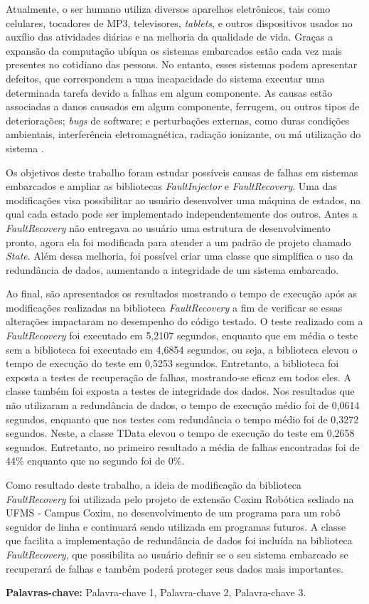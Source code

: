 {\setlength{\parindent}{0cm}
	
Atualmente, o ser humano utiliza diversos aparelhos eletrônicos, tais como celulares, tocadores de MP3, televisores, \textit{tablets}, e outros dispositivos usados no auxílio das atividades diárias e na melhoria da qualidade de vida. Graças a expansão da computação ubíqua os sistemas embarcados estão cada vez mais presentes no cotidiano das pessoas. No entanto, esses sistemas podem apresentar defeitos, que correspondem a uma incapacidade do sistema executar uma determinada tarefa devido a falhas em algum componente. As causas estão associadas a danos causados em algum componente, ferrugem, ou outros tipos de deteriorações; \textit{bugs} de software; e perturbações externas, como duras condições ambientais, interferência eletromagnética, radiação ionizante, ou má utilização do sistema \cite{Nelson:1990}.

Os objetivos deste trabalho foram estudar possíveis causas de falhas em sistemas embarcados e ampliar as bibliotecas \textit{FaultInjector} e \textit{FaultRecovery}. Uma das modificações visa possibilitar ao usuário desenvolver uma máquina de estados, na qual cada estado pode ser implementado independentemente dos outros. Antes a \textit{FaultRecovery} não entregava ao usuário uma estrutura de desenvolvimento pronto, agora ela foi modificada para atender a um padrão de projeto chamado \textit{State}. Além dessa melhoria, foi possível criar uma classe que simplifica o uso da redundância de dados, aumentando a integridade de um sistema embarcado.

Ao final, são apresentados os resultados mostrando o tempo de execução após as modificações realizadas na biblioteca \textit{FaultRecovery} a fim de verificar se essas alterações impactaram no desempenho do código testado. O teste realizado com a \textit{FaultRecovery} foi executado em 5,2107 segundos, enquanto que em média o teste sem a biblioteca foi executado em 4,6854 segundos, ou seja, a biblioteca elevou o tempo de execução do teste em 0,5253 segundos. Entretanto, a biblioteca foi exposta a testes de recuperação de falhas, mostrando-se eficaz em todos eles. A classe também foi exposta a testes de integridade dos dados. Nos resultados que não utilizaram a redundância de dados, o tempo de execução médio foi de 0,0614 segundos, enquanto que nos testes com redundância o tempo médio foi de 0,3272 segundos. Neste, a classe TData elevou o tempo de execução do teste em 0,2658 segundos. Entretanto, no primeiro resultado a média de falhas encontradas foi de 44\% enquanto que no segundo foi de 0\%.

Como resultado deste trabalho, a ideia de modificação da biblioteca \textit{FaultRecovery} foi utilizada pelo projeto de extensão Coxim Robótica sediado na UFMS - Campus Coxim, no desenvolvimento de um programa para um robô seguidor de linha e continuará sendo utilizada em programas futuros. A classe que facilita a implementação de redundância de dados foi incluída na biblioteca \textit{FaultRecovery}, que possibilita ao usuário definir se o seu sistema embarcado se recuperará de falhas e também poderá proteger seus dados mais importantes.

\textbf{Palavras-chave:} Palavra-chave 1, Palavra-chave 2, Palavra-chave 3.
	
}